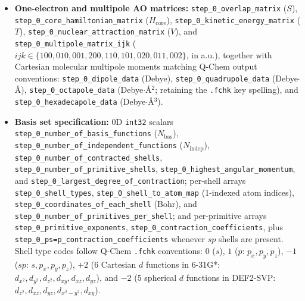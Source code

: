 \documentclass[fleqn,10pt]{article}
\begin{document}
{\begin{itemize}
\item \textbf{One-electron and multipole AO matrices:} \texttt{step\_\allowbreak{}0\_\allowbreak{}overlap\_\allowbreak{}matrix} ($S$), \texttt{step\_\allowbreak{}0\_\allowbreak{}core\_\allowbreak{}hamiltonian\_\allowbreak{}matrix} ($H_{\mathrm{core}}$), \texttt{step\_\allowbreak{}0\_\allowbreak{}kinetic\_\allowbreak{}energy\_\allowbreak{}matrix} ($T$), \texttt{step\_\allowbreak{}0\_\allowbreak{}nuclear\_\allowbreak{}attraction\_\allowbreak{}matrix} ($V$), and \texttt{step\_\allowbreak{}0\_\allowbreak{}multipole\_\allowbreak{}matrix\_\allowbreak{}ijk} ($ijk \in \{100,\allowbreak 010,\allowbreak 001,\allowbreak 200,\allowbreak 110,\allowbreak 101,\allowbreak 020,\allowbreak 011,\allowbreak 002\}$, in a.u.), together with Cartesian molecular multipole moments matching Q-Chem output conventions: \texttt{step\_\allowbreak{}0\_\allowbreak{}dipole\_\allowbreak{}data} (Debye), \texttt{step\_\allowbreak{}0\_\allowbreak{}quadrupole\_\allowbreak{}data} (Debye$\cdot$\AA{}), \texttt{step\_\allowbreak{}0\_\allowbreak{}octapole\_\allowbreak{}data} (Debye$\cdot$\AA{}$^2$; retaining the \texttt{.fchk} key spelling), and \texttt{step\_\allowbreak{}0\_\allowbreak{}hexadecapole\_\allowbreak{}data} (Debye$\cdot$\AA{}$^3$).
\item \textbf{Basis set specification:} 0D \texttt{int32} scalars \texttt{step\_\allowbreak{}0\_\allowbreak{}number\_\allowbreak{}of\_\allowbreak{}basis\_\allowbreak{}functions} ($N_{\mathrm{bas}}$), \texttt{step\_\allowbreak{}0\_\allowbreak{}number\_\allowbreak{}of\_\allowbreak{}independent\_\allowbreak{}functions} ($N_{\mathrm{indep}}$), \texttt{step\_\allowbreak{}0\_\allowbreak{}number\_\allowbreak{}of\_\allowbreak{}contracted\_\allowbreak{}shells}, \texttt{step\_\allowbreak{}0\_\allowbreak{}number\_\allowbreak{}of\_\allowbreak{}primitive\_\allowbreak{}shells}, \texttt{step\_\allowbreak{}0\_\allowbreak{}highest\_\allowbreak{}angular\_\allowbreak{}momentum}, and \texttt{step\_\allowbreak{}0\_\allowbreak{}largest\_\allowbreak{}degree\_\allowbreak{}of\_\allowbreak{}contraction}; per-shell arrays \texttt{step\_\allowbreak{}0\_\allowbreak{}shell\_\allowbreak{}types}, \texttt{step\_\allowbreak{}0\_\allowbreak{}shell\_\allowbreak{}to\_\allowbreak{}atom\_\allowbreak{}map} (1-indexed atom indices), \texttt{step\_\allowbreak{}0\_\allowbreak{}coordinates\_\allowbreak{}of\_\allowbreak{}each\_\allowbreak{}shell} (Bohr), and \texttt{step\_\allowbreak{}0\_\allowbreak{}number\_\allowbreak{}of\_\allowbreak{}primitives\_\allowbreak{}per\_\allowbreak{}shell}; and per-primitive arrays \texttt{step\_\allowbreak{}0\_\allowbreak{}primitive\_\allowbreak{}exponents}, \texttt{step\_\allowbreak{}0\_\allowbreak{}contraction\_\allowbreak{}coefficients}, plus \texttt{step\_\allowbreak{}0\_\allowbreak{}ps=p\_\allowbreak{}contraction\_\allowbreak{}coefficients} whenever $sp$ shells are present. Shell type codes follow Q-Chem \texttt{.fchk} conventions: $0$ ($s$), $1$ ($p$: $p_x, p_y, p_z$), $-1$ ($sp$: $s, p_x, p_y, p_z$), $+2$ (6 Cartesian $d$ functions in 6-31G*: $d_{x^2},\allowbreak d_{y^2},\allowbreak d_{z^2},\allowbreak d_{xy},\allowbreak d_{xz},\allowbreak d_{yz}$), and $-2$ (5 spherical $d$ functions in DEF2-SVP: $d_{z^2},\allowbreak d_{xz},\allowbreak d_{yz},\allowbreak d_{x^2-y^2},\allowbreak d_{xy}$).

\end{itemize}}
\end{document}
